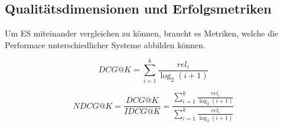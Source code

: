 \subsection{Qualitätsdimensionen und Erfolgsmetriken}
Um \ac{ES} miteinander vergleichen zu können, braucht es Metriken, welche die Performace unterschiedlicher
Systeme abbilden können. 

\begin{equation}
\label{eq:dcg}
DCG@K=\sum_{i=1}^{k}\frac{rel_{i}}{\log_2(i+1)}
\end{equation}

\label{sec:idcg}

\begin{equation}
\label{eq:ndcg}
NDCG@K=\frac{DCG@K}{IDCG@K}=\frac{\sum_{i=1}^{k}\frac{rel_{i}}{\log_2(i+1)}}{\sum_{i=1}^{k}\frac{rel_{i}}{\log_2(i+1)}}
\end{equation}

\Cite{Jarvelin_ndcg_2002}


